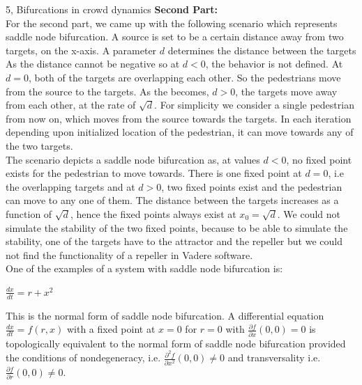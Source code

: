 \documentclass[10pt,a4paper]{article}
\begin{document}
\begin{task}{5, Bifurcations in crowd dynamics}
\textbf{Second Part:} \\
For the second part, we came up with the following scenario which represents saddle node bifurcation. A source is set to be a certain distance away from two targets, on the x-axis. A parameter $d$ determines the distance between the targets As the distance cannot be negative so at $d < 0$, the behavior is not defined. At $d=0$, both of the targets are overlapping each other. So the pedestrians move from the source to the targets. As the becomes, $d > 0$, the targets move away from each other, at the rate of $\sqrt{d}$. For simplicity we consider a single pedestrian from now on, which moves from the source towards the targets. In each iteration depending upon initialized location of the pedestrian, it can move towards any of the two targets.\\

The scenario depicts a saddle node bifurcation as, at values $d < 0$, no fixed point exists for the pedestrian to move towards. There is one fixed point at $d = 0$, i.e the overlapping targets and at $d > 0$, two fixed points exist and the pedestrian can move to any one of them. The distance between the targets increases as a function of $\sqrt{d}$, hence the fixed points always exist at $x_{0}=\sqrt{d}$. We could not simulate the stability of the two fixed points, because to be able to simulate the stability, one of the targets have to the attractor and the repeller but we could not find the functionality of a repeller in Vadere software. \\

One of the examples of a system with saddle node bifurcation is: \\
\begin{center}
$\frac{dx}{dt} = r + x^{2}$
\end{center}

This is the normal form of saddle node bifurcation. A differential equation $\frac{dx}{dt} = f(r, x)$ with a fixed point at $x=0$ for $r=0$ with $\frac{\partial f}{\partial x}(0, 0) = 0$ is topologically equivalent to the normal form of saddle node bifurcation provided the conditions of nondegeneracy, i.e. $\frac{\partial^2 f}{\partial x^2}(0, 0) \neq 0$ and transversality i.e. $\frac{\partial f}{\partial r}(0, 0) \neq 0$. 


\end{task}
\end{document}

